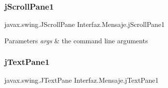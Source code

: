 \subsubsection{\texorpdfstring{j\+Scroll\+Pane1}{jScrollPane1}}
{\footnotesize\ttfamily javax.\+swing.\+J\+Scroll\+Pane Interfaz.\+Mensaje.\+j\+Scroll\+Pane1\hspace{0.3cm}{\ttfamily [private]}}


\begin{DoxyParams}{Parameters}
{\em args} & the command line arguments \\
\hline
\end{DoxyParams}
\mbox{\label{class_interfaz_1_1_mensaje_abbd0afdc912a7465ded350b063ae1a4e}} 
\subsubsection{\texorpdfstring{j\+Text\+Pane1}{jTextPane1}}
{\footnotesize\ttfamily javax.\+swing.\+J\+Text\+Pane Interfaz.\+Mensaje.\+j\+Text\+Pane1\hspace{0.3cm}{\ttfamily [private]}}

